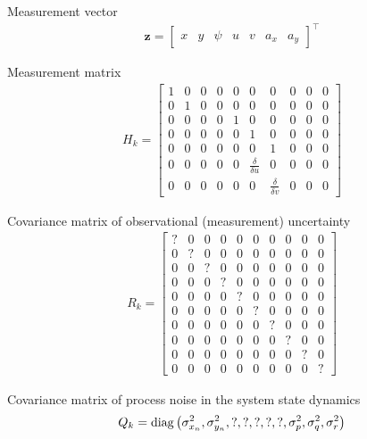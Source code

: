 Measurement vector
\begin{align}
\mathbf z=
\begin{bmatrix}
x & y & \psi & u & v & a_x & a_y
\end{bmatrix}^\top
\end{align}

Measurement matrix
\begin{align}
H_k =
\begin{bmatrix}
1 & 0 & 0 & 0 & 0 & 0 & 0 & 0 & 0 & 0 \\
0 & 1 & 0 & 0 & 0 & 0 & 0 & 0 & 0 & 0 \\
0 & 0 & 0 & 0 & 1 & 0 & 0 & 0 & 0 & 0 \\
0 & 0 & 0 & 0 & 0 & 1 & 0 & 0 & 0 & 0 \\
0 & 0 & 0 & 0 & 0 & 0 & 1 & 0 & 0 & 0 \\
0 & 0 & 0 & 0 & 0 & \frac{\delta}{\delta u} & 0 & 0 & 0 & 0 \\
0 & 0 & 0 & 0 & 0 & 0 & \frac{\delta}{\delta v} & 0 & 0 & 0
\end{bmatrix}
\end{align}


Covariance matrix of observational (measurement) uncertainty
\begin{align}
R_k =
\begin{bmatrix}
? & 0 & 0 & 0 & 0 & 0 & 0 & 0 & 0 & 0 \\
0 & ? & 0 & 0 & 0 & 0 & 0 & 0 & 0 & 0 \\
0 & 0 & ? & 0 & 0 & 0 & 0 & 0 & 0 & 0 \\
0 & 0 & 0 & ? & 0 & 0 & 0 & 0 & 0 & 0 \\
0 & 0 & 0 & 0 & ? & 0 & 0 & 0 & 0 & 0 \\
0 & 0 & 0 & 0 & 0 & ? & 0 & 0 & 0 & 0 \\
0 & 0 & 0 & 0 & 0 & 0 & ? & 0 & 0 & 0 \\
0 & 0 & 0 & 0 & 0 & 0 & 0 & ? & 0 & 0 \\
0 & 0 & 0 & 0 & 0 & 0 & 0 & 0 & ? & 0 \\
0 & 0 & 0 & 0 & 0 & 0 & 0 & 0 & 0 & ?
\end{bmatrix}
\end{align}

Covariance matrix of process noise in the system state dynamics
\begin{align}
Q_k = \mathrm{diag}\left(
\sigma_{x_n}^2, \sigma_{y_n}^2 , ?, ?, ?, ?, ?, \sigma_p^2, \sigma_q^2, \sigma_r^2\right)
\end{align}


